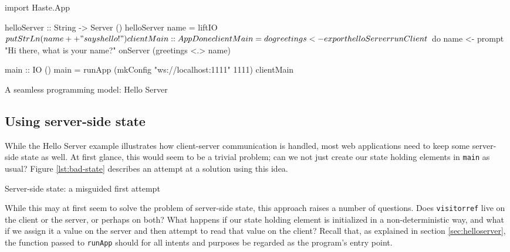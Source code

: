 \documentclass[preprint]{sigplanconf}
\begin{document}
\begin{listingfloat}
\begin{code}
import Haste.App

helloServer :: String -> Server ()
helloServer name =
  liftIO $ putStrLn (name ++ " says hello!")

clientMain :: App Done
clientMain = do
  greetings <- export helloServer

  runClient $ do
    name <- prompt "Hi there, what is your name?"
    onServer (greetings <.> name)

main :: IO ()
main = runApp (mkConfig "ws://localhost:1111" 1111)
              clientMain
\end{code}
\caption{A seamless programming model: Hello Server}
\label{lst:hello-server}
\end{listingfloat}

\subsection{Using server-side state}

While the Hello Server example illustrates how client-server communication is
handled, most web applications need to keep some server-side state as well.
At first glance, this would seem to be a trivial problem; can we not just
create our state holding elements in \lstinline!main! as usual?
Figure \ref{lst:bad-state} describes an attempt at a solution using this idea.

\begin{listingfloat}
\caption{Server-side state: a misguided first attempt}
\label{lst:bad-state}
\end{listingfloat}

While this may at first seem to solve the problem of server-side state, this
approach raises a number of questions. Does \lstinline!visitorref! live on the
client or the server, or perhaps on both? What happens if our state holding
element is initialized in a non-deterministic way, and what if we assign it
a value on the server and then attempt to read that value on the client?
Recall that, as explained in section \ref{sec:helloserver}, the function
passed to \lstinline!runApp! should for all intents and purposes be regarded as
the program's entry point.
\end{document}
